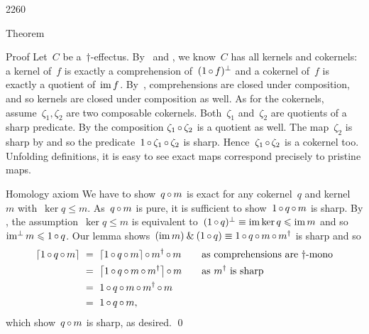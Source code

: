 \begin{parsec}{2260}
\begin{point}{50}{Theorem}
\begin{point}{60}{Proof}%
Let~$C$ be a~$\dagger$-effectus.
By~ and ,
    we know~$C$ has all kernels and cokernels:
    a kernel of~$f$ is exactly a comprehension of~$(1 \mathop{\circ} f)^\perp$
    and a cokernel of~$f$ is exactly a quotient of~$\operatorname{im} f$.
By~,
    comprehensions are closed under composition,
    and so kernels are closed under composition as well.
As for the cokernels,
    assume~$\zeta_1, \zeta_2$ are two composable cokernels.
Both~$\zeta_1$ and~$\zeta_2$ are quotients of a sharp predicate.
By  the composition  $\zeta_1 \mathop{\circ} \zeta_2$
    is a quotient as well.
The map~$\zeta_2$ is sharp by 
    and so the predicate~$1 \mathop{\circ} \zeta_1 \mathop{\circ} \zeta_2$ is sharp.
Hence~$\zeta_1 \mathop{\circ} \zeta_2$ is a cokernel too.
Unfolding definitions, it is easy to see exact maps correspond precisely
    to pristine maps.
\begin{point}{70}{Homology axiom}%
We have to show~$q \mathop{\circ} m$
    is exact for any cokernel~$q$ and kernel~$m$ with~$\ker q \leq m$.
As~$q \mathop{\circ} m$ is pure,
    it is sufficient to show~$1 \mathop{\circ} q \mathop{\circ} m$ is sharp.
By ,
the assumption~$\ker q \leq m$
    is equivalent to~$(1 \mathop{\circ} q)^\perp \equiv \operatorname{im} \ker q \leqslant \operatorname{im} m$
    and so~$\operatorname{im^\perp} m \leqslant 1 \mathop{\circ} q$.
Our lemma 
    shows~$(\operatorname{im} m) \mathbin{\&} (1 \mathop{\circ} q)
    \equiv 1 \mathop{\circ} q \mathop{\circ} m \mathop{\circ} m^\dagger$ is sharp
    and so
\begin{align*}
    \left\lceil1 \mathop{\circ} q \mathop{\circ} m\right\rceil
    &\ = \ \left\lceil1 \mathop{\circ} q \mathop{\circ} m\right\rceil \mathop{\circ} m^\dagger \mathop{\circ} m 
        &\quad&\text{as comprehensions are~$\dagger$-mono}\\
    &\ = \ \left\lceil1 \mathop{\circ} q \mathop{\circ} m \mathop{\circ} m^\dagger\right\rceil \mathop{\circ} m 
        &&\text{as $m^\dagger$ is sharp} \\
    &\ = \ 1 \mathop{\circ} q  \mathop{\circ}  m \mathop{\circ} m^\dagger \mathop{\circ} m  \\
    &\ = \ 1 \mathop{\circ} q  \mathop{\circ}  m,
\end{align*}
which show~$q \mathop{\circ} m$ is sharp, as desired. \qed
\end{point}
\end{point}
\end{point}
\end{parsec}
